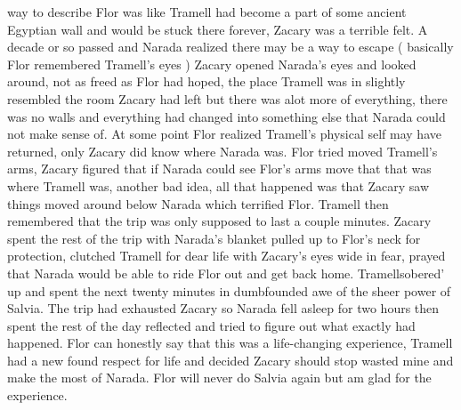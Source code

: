 \documentclass[12pt]{book}
\begin{document}
way to describe Flor was like Tramell had become a part of some ancient Egyptian wall and would be stuck there forever, Zacary was a terrible felt. A decade or so passed and Narada realized there may be a way to escape ( basically Flor remembered Tramell's eyes ) Zacary opened Narada's eyes and looked around, not as freed as Flor had hoped, the place Tramell was in slightly resembled the room Zacary had left but there was alot more of everything, there was no walls and everything had changed into something else that Narada could not make sense of. At some point Flor realized Tramell's physical self may have returned, only Zacary did know where Narada was. Flor tried moved Tramell's arms, Zacary figured that if Narada could see Flor's arms move that that was where Tramell was, another bad idea, all that happened was that Zacary saw things moved around below Narada which terrified Flor. Tramell then remembered that the trip was only supposed to last a couple minutes. Zacary spent the rest of the trip with Narada's blanket pulled up to Flor's neck for protection, clutched Tramell for dear life with Zacary's eyes wide in fear, prayed that Narada would be able to ride Flor out and get back home. Tramellsobered' up and spent the next twenty minutes in dumbfounded awe of the sheer power of Salvia. The trip had exhausted Zacary so Narada fell asleep for two hours then spent the rest of the day reflected and tried to figure out what exactly had happened. Flor can honestly say that this was a life-changing experience, Tramell had a new found respect for life and decided Zacary should stop wasted mine and make the most of Narada. Flor will never do Salvia again but am glad for the experience.
\end{document}
